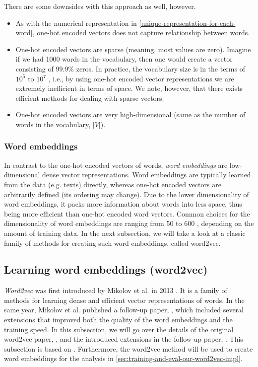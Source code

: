 There are some downsides with this approach as well, however.
\begin{itemize}
    \item As with the numerical representation in \cref{unique-representation-for-each-word}, one-hot encoded vectors does not capture relationship between words.
    \item One-hot encoded vectors are sparse (meaning, most values are zero). Imagine if we had 1000 words in the vocabulary, then one would create a vector consisting of 99.9\% zeros. In practice, the vocabulary size is in the terms of $10^5$ to $10^7$ \cite{mikolov2013b}, i.e., by using one-hot encoded vector representations we are extremely inefficient in terms of space. We note, however, that there exists efficient methods for dealing with sparse vectors.
    \item One-hot encoded vectors are very high-dimensional (same as the number of words in the vocabulary, $|V|$).
\end{itemize}

\subsubsection{Word embeddings}
In contrast to the one-hot encoded vectors of words, \textit{word embeddings} are low-dimensional dense vector representations. Word embeddings are typically learned from the data (e.g. texts) directly, whereas one-hot encoded vectors are arbitrarily defined (its ordering may change). Due to the lower dimensionality of word embeddings, it packs more information about words into less space, thus being more efficient than one-hot encoded word vectors. Common choices for the dimensionality of word embeddings are ranging from 50 to 600 \cite{mikolov2013a}, depending on the amount of training data. In the next subsection, we will take a look at a classic family of methods for creating such word embeddings, called word2vec.

\subsection{Learning word embeddings (word2vec)}
\label{sec:word2vec}
\textit{Word2vec} was first introduced by Mikolov et al. in 2013 \cite{mikolov2013a}. It is a family of methods for learning dense and efficient vector representations of words. In the same year, Mikolov et al. published a follow-up paper, \cite{mikolov2013b}, which included several extensions that improved both the quality of the word embeddings and the training speed. In this subsection, we will go over the details of the original word2vec paper, \cite{mikolov2013a}, and the introduced extensions in the follow-up paper, \cite{mikolov2013b}. This subsection is based on \cites{mikolov2013a}{mikolov2013b}. Furthermore, the word2vec method will be used to create word embeddings for the analysis in \cref{sec:training-and-eval-our-word2vec-impl}.

